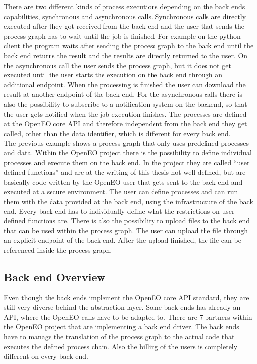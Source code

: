 \documentclass[draft,final]{vutinfth} %
\begin{document}
There are two different kinds of process executions depending on the back ends capabilities, synchronous and asynchronous calls. Synchronous calls are directly executed after they got received from the back end and the user that sends the process graph has to wait until the job is finished. For example on the python client the program waits after sending the process graph to the back end until the back end returns the result and the results are directly returned to the user. On the asynchronous call the user sends the process graph, but it does not get executed until the user starts the execution on the back end through an additional endpoint. When the processing is finished the user can download the result at another endpoint of the back end. For the asynchronous calls there is also the possibility to subscribe to a notification system on the backend, so that the user gets notified when the job execution finishes.     
The processes are defined at the OpenEO core API and therefore independent from the back end they get called, other than the data identifier, which is different for every back end.  
\\
The previous example shows a process graph that only uses predefined processes and data. Within the OpenEO project there is the possibility to define individual processes and execute them on the back end. In the project they are called “user defined functions” and are at the writing of this thesis not well defined, but are basically code written by the OpenEO user that gets sent to the back end and executed at a secure environment. The user can define processes and can run them with the data provided at the back end, using the infrastructure of the back end. Every back end has to individually define what the restrictions on user defined functions are. 
There is also the possibility to upload files to the back end that can be used within the process graph. The user can upload the file through an explicit endpoint of the back end. After the upload finished, the file can be referenced inside the process graph.   %

\subsection{Back end Overview}
Even though the back ends implement the OpenEO core API standard, they are still very diverse behind the abstraction layer. Some back ends has already an API, where the OpenEO calls have to be adapted to. There are 7 partners within the OpenEO project that are implementing a back end driver. The back ends have to manage the translation of the process graph to the actual code that executes the defined process chain. Also the billing of the users is completely different on every back end. 
\end{document}
